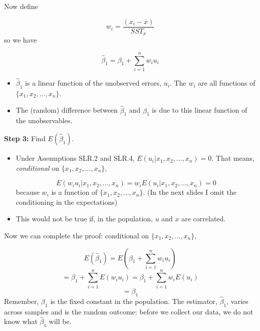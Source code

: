 \documentclass[notes=show]{beamer}
\begin{document}
\begin{frame}[plain]

 Now define

 \begin{equation}
  w_{i}=\frac{(x_{i}-\overline{x})}{SST_{x}}
 \end{equation}
 so we have

 \begin{equation}
  \hat{\beta}_{1}=\beta _{1}+\sum_{i=1}^{n}w_{i}u_{i}
 \end{equation}
 \begin{itemize}
  \item $\hat{\beta}_{1}$ is a linear function of the unobserved errors, $u_{i}$. The $w_{i}$ are all functions of $\{x_{1},x_{2},...,x_{n}\}$.
 
  \item The (random) difference between $\hat{\beta}_{1}$ and $\beta _{1}$ is due to this linear function of the unobservables.
 \end{itemize}
\end{frame}

\begin{frame}[plain]

\textbf{Step 3:} Find $E(\hat{\beta}_{1})$.
 \begin{itemize}
  \item Under Assumptions SLR.2 and SLR.4, $E(u_{i}|x_{1},x_{2},...,x_{n})=0$. That means, \textit{conditional} on $\{x_{1},x_{2},...,x_{n}\}$,

 \begin{equation*}
  E(w_{i}u_{i}|x_{1},x_{2},...,x_{n})=w_{i}E(u_{i}|x_{1},x_{2},...,x_{n})=0
 \end{equation*}
 because $w_{i}$ is a function of $\{x_{1},x_{2},...,x_{n}\}$. (In the next slides I omit the conditioning in the expectations)

  \item This would not be true if, in the population, $u$ and $x$ are correlated.
 \end{itemize}
\end{frame}

\begin{frame}[plain]

 Now we can complete the proof: conditional on $\{x_{1},x_{2},...,x_{n}\}$,

 \begin{equation}
  E(\hat{\beta}_{1})=E\left( \beta _{1}+\sum_{i=1}^{n}w_{i}u_{i}\right)
 \end{equation}
 \begin{equation}
  =\beta_{1}+\sum_{i=1}^{n}E(w_{i}u_{i})=\beta_{1}+\sum_{i=1}^{n}w_{i}E(u_{i})
 \end{equation}
 \begin{equation}
  =\beta_{1}
 \end{equation}
 \linebreak
 Remember, $\beta _{1}$ is the fixed constant in the population. The estimator, $\hat{\beta}_{1}$, varies across samples and is the random outcome: before we collect our data, we do not know what $\hat{\beta}_{1}$ will be.
\end{frame}
\end{document}
